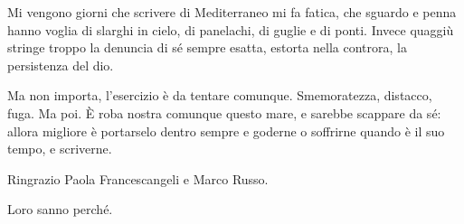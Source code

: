 Mi vengono giorni che scrivere di Mediterraneo mi fa fatica, che sguardo e penna hanno voglia di slarghi in cielo, di panelachi, di guglie e di ponti. Invece quaggiù stringe troppo la denuncia di sé sempre esatta, estorta nella controra, la persistenza del dio.

Ma non importa, l'esercizio è da tentare comunque. Smemoratezza, distacco, fuga. Ma poi. È roba nostra comunque questo mare, e sarebbe scappare da sé: allora migliore è portarselo dentro sempre e goderne o soffrirne quando è il suo tempo, e scriverne.

\newpage

\vspace*{12cm}

Ringrazio Paola Francescangeli e Marco Russo.

Loro sanno perché.
